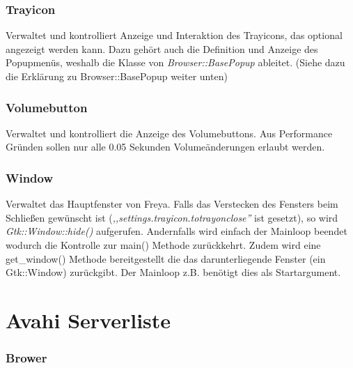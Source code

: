 \subsubsection{Trayicon}
Verwaltet und kontrolliert Anzeige und Interaktion des Trayicons, das optional angezeigt werden kann.
Dazu gehört auch die Definition und Anzeige des Popupmenüs, weshalb die Klasse von \textit{Browser::BasePopup} ableitet.
(Siehe dazu die Erklärung zu Browser::BasePopup weiter unten)

\subsubsection{Volumebutton}
Verwaltet und kontrolliert die Anzeige des Volumebuttons. Aus Performance Gründen sollen nur alle 0.05 Sekunden Volumeänderungen erlaubt werden.

\subsubsection{Window}
Verwaltet das Hauptfenster von Freya.
Falls das Verstecken des Fensters beim Schließen gewünscht ist (\emph{,,settings.trayicon.totrayonclose''} ist gesetzt),
so wird \emph{Gtk::Window::hide()} aufgerufen.
Andernfalls wird einfach der Mainloop beendet wodurch die Kontrolle zur main() Methode zurückkehrt.
Zudem wird eine get\_window() Methode bereitgestellt die das darunterliegende Fenster (ein Gtk::Window) zurückgibt.
Der Mainloop z.B. benötigt dies als Startargument.
\section{Avahi Serverliste}
\subsubsection{Brower}

